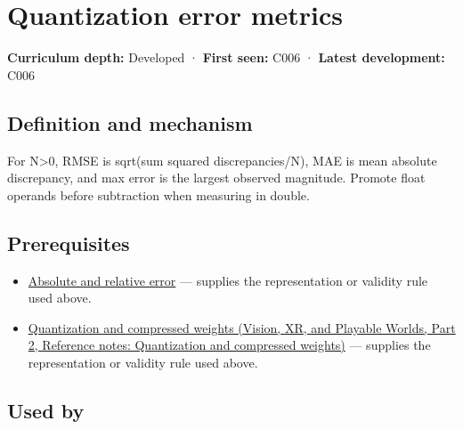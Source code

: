 \hypertarget{appendix-537171d69d27}{}\label{referencestart:appendix-537171d69d27}
\section{Quantization error metrics}\label{appendix-537171d69d27-quantization-error-metrics}

\hypertarget{appendix-537171d69d27-quantization-error-metrics}{}

\textbf{Curriculum depth:} Developed · \textbf{First seen:} C006 · \textbf{Latest development:} C006

\begin{allmightroledefinition}

\subsection{Definition and mechanism}\label{appendix-537171d69d27-definition-and-mechanism}

\hypertarget{appendix-537171d69d27-definition-and-mechanism}{}

For N\textgreater0, RMSE is sqrt(sum squared discrepancies/N), MAE is mean absolute discrepancy, and max error is the largest observed magnitude. Promote float operands before subtraction when measuring in double.

\end{allmightroledefinition}

\subsection{Prerequisites}\label{appendix-537171d69d27-prerequisites}

\hypertarget{appendix-537171d69d27-prerequisites}{}

\begin{itemize}
\tightlist
\item
  \hyperref[appendix-3ae74e89b4e6]{Absolute and relative error} --- supplies the representation or validity rule used above.
\item
  \href{../07-Vision-XR-and-Playable-Worlds-P02/main.pdf\#nameddest=appendix-fdc7879e8bf2}{Quantization and compressed weights (Vision, XR, and Playable Worlds, Part 2, Reference notes: Quantization and compressed weights)} --- supplies the representation or validity rule used above.
\end{itemize}

\subsection{Used by}\label{appendix-537171d69d27-used-by}

